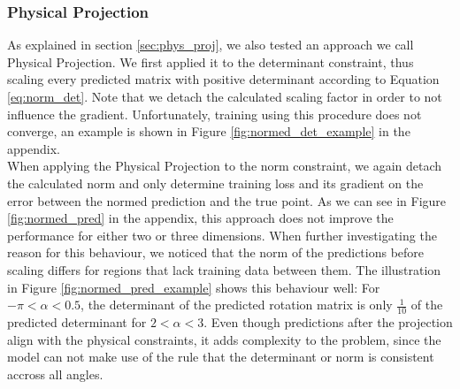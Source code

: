 \subsubsection{Physical Projection}
As explained in section \ref{sec:phys_proj}, we also tested an approach we call Physical Projection. We first applied it to the determinant constraint, thus scaling every predicted matrix with positive determinant according to Equation \ref{eq:norm_det}. Note that we detach the calculated scaling factor in order to not influence the gradient. Unfortunately, training using this procedure does not converge, an example is shown in Figure \ref{fig:normed_det_example} in the appendix.\\
\indent When applying the Physical Projection to the norm constraint, we again detach the calculated norm and only determine training loss and its gradient on the error between the normed prediction and the true point. As we can see in Figure \ref{fig:normed_pred} in the appendix, this approach does not improve the performance for either two or three dimensions. When further investigating the reason for this behaviour, we noticed that the norm of the predictions before scaling differs for regions that lack training data between them. The illustration in Figure \ref{fig:normed_pred_example} shows this behaviour well: For $-\pi < \alpha < 0.5$, the determinant of the predicted rotation matrix is only $\frac{1}{10}$ of the predicted determinant for $2 < \alpha < 3$. Even though predictions after the projection align with the physical constraints, it adds complexity to the problem, since the model can not make use of the rule that the determinant or norm is consistent accross all angles.







\clearpage

